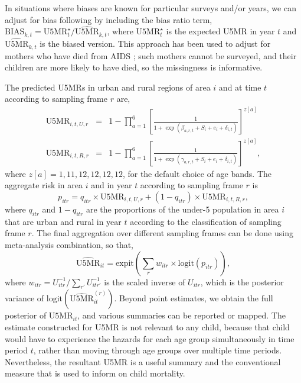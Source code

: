 In situations where biases are known for particular surveys and/or years, we can adjust for bias following \citet{wakefield_etal_19} by including the bias ratio term, \(\mbox{BIAS}_{k,t} = \mbox{U5MR}^\star_{t} / \widehat{\mbox{U5MR}}_{k, t}\), where \(\mbox{U5MR}^\star_{t}\) is the expected U5MR in year \(t\) and \(\widehat{\mbox{U5MR}}_{k, t}\) is the biased version.
This approach has been used to adjust for mothers who have died from AIDS \citep{walker_etal_12}; such mothers cannot be surveyed, and their children are more likely to have died, so the missingness is informative.

The predicted U5MRs in urban and rural regions of area \(i\) and at time \(t\) according to sampling frame \(r\) are,
\begin{eqnarray}\label{eq:U5MR}
\mbox{U5MR}_{i,t,U,r} &=&
1- \prod_{a=1}^6
\left[ \frac{1}{1+\exp(
\beta_{a,r,t}  + S_{i} + e_{i}  +\delta_{i,t}) }\right]^{z[a]}\\
 \mbox{U5MR}_{i,t,R,r} &=&
1- \prod_{a=1}^6
\left[ \frac{1}{1+\exp(
\gamma_{a,r,t} + S_{i} + e_{i}  +\delta_{i,t}) }\right]^{z[a]},
\end{eqnarray}
where \(z[a]=1,11,12,12,12,12\), for the default choice of age bands.
The aggregate risk in area \(i\) and in year \(t\) according to sampling frame \(r\) is
\begin{equation}\label{eq:agg2}
p_{itr} = q_{itr}\times \mbox{U5MR}_{i,t,U,r} + (1-q_{itr})\times  \mbox{U5MR}_{i,t,R,r},
\end{equation}
where \(q_{itr}\) and \(1-q_{itr}\) are the proportions of the under-5 population in area \(i\) that are urban and rural in year \(t\) according to the classification of sampling frame \(r\). The final aggregation over different sampling frames can be done using meta-analysis combination, so that,
\[
\widehat{\mbox{U5MR}}_{it} = \mbox{expit}\left(\sum_r w_{itr} \times \mbox{logit}(p_{itr})\right),
\]
where \(w_{itr}=U_{itr}^{-1}/\sum_{r'} U_{itr'}^{-1}\) is the scaled inverse of \(U_{itr}\), which is the posterior variance of \(\mbox{logit}(\widehat{\mbox{U5MR}}_{it}^{(r)})\). Beyond point estimates, we obtain the full posterior of \(\mbox{U5MR}_{it}\), and various summaries can be reported or mapped. The estimate constructed for U5MR is not relevant to any child, because that child would have to experience the hazards for each age group simultaneously in time period \(t\), rather than moving through age groups over multiple time periods. Nevertheless, the resultant U5MR is a useful summary and the conventional measure that is used to inform on child mortality.

